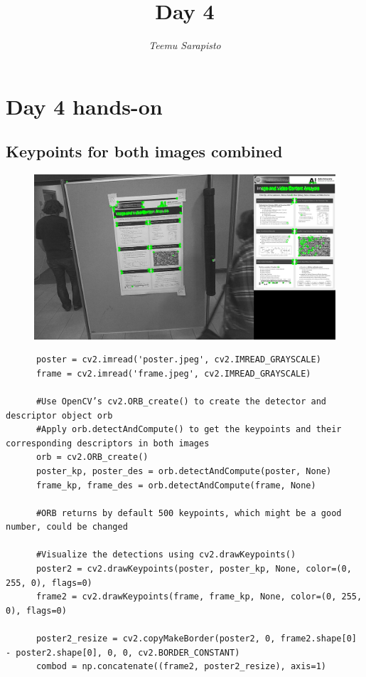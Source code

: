 \documentclass{article}
\begin{document}
\title{Day 4}

\author{\emph{Teemu Sarapisto}}
\maketitle

\def\code#1{\texttt{#1}}
\newcommand{\aaa}[3]{%
  \fbox{\texttt{[image: \#1]}} \quad
  \fbox{\texttt{[image: \#2]}} \quad
  \fbox{\texttt{[image: \#3]}} \par}
\newcommand{\bbb}[3]{%
  \medskip\noindent\aaa{#1}{#1-#2}{#1-#3}}

\newpage

\setlength{\fboxsep}{0pt}%

\section{Day 4 hands-on }


\subsection{Keypoints for both images combined}
  \begin{figure}[h]
      \centering
      \includegraphics[scale=0.35]{keypoints_combined}
  \end{figure}
  \begin{verbatim}
      poster = cv2.imread('poster.jpeg', cv2.IMREAD_GRAYSCALE)
      frame = cv2.imread('frame.jpeg', cv2.IMREAD_GRAYSCALE)

      #Use OpenCV’s cv2.ORB_create() to create the detector and descriptor object orb
      #Apply orb.detectAndCompute() to get the keypoints and their corresponding descriptors in both images
      orb = cv2.ORB_create()
      poster_kp, poster_des = orb.detectAndCompute(poster, None)
      frame_kp, frame_des = orb.detectAndCompute(frame, None)

      #ORB returns by default 500 keypoints, which might be a good number, could be changed

      #Visualize the detections using cv2.drawKeypoints()
      poster2 = cv2.drawKeypoints(poster, poster_kp, None, color=(0, 255, 0), flags=0)
      frame2 = cv2.drawKeypoints(frame, frame_kp, None, color=(0, 255, 0), flags=0)

      poster2_resize = cv2.copyMakeBorder(poster2, 0, frame2.shape[0] - poster2.shape[0], 0, 0, cv2.BORDER_CONSTANT)
      combod = np.concatenate((frame2, poster2_resize), axis=1)
  \end{verbatim}
\end{document}
